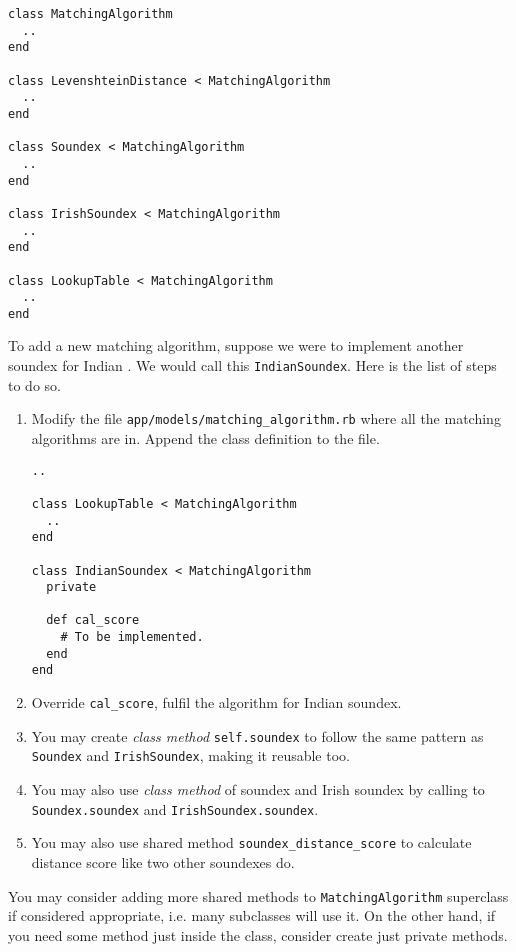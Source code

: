 \begin{minipage}{\linewidth}
  \begin{lstlisting}[label={lst:maf}, caption={\texttt{matching\_algorithm.rb}.}]
class MatchingAlgorithm
  ..
end

class LevenshteinDistance < MatchingAlgorithm
  ..
end

class Soundex < MatchingAlgorithm
  ..
end

class IrishSoundex < MatchingAlgorithm
  ..
end

class LookupTable < MatchingAlgorithm
  ..
end
\end{lstlisting}
\end{minipage}

To add a new matching algorithm, suppose we were to implement another
soundex for Indian \cite[]{indiansoundex}. We would call this \texttt{IndianSoundex}.
Here is the list of steps to do so.

\begin{enumerate}
  \item Modify the file \texttt{app/models/matching\_algorithm.rb} where all
    the matching algorithms are in. Append the class definition to the file.

    \begin{minipage}{\linewidth}
    \begin{lstlisting}
..

class LookupTable < MatchingAlgorithm
  ..
end

class IndianSoundex < MatchingAlgorithm
  private

  def cal_score
    # To be implemented.
  end
end
    \end{lstlisting}
    \end{minipage}

  \item Override \texttt{cal\_score}, fulfil the algorithm for Indian
    soundex.
  \item You may create \emph{class method} \texttt{self.soundex} to follow
    the same pattern as \texttt{Soundex} and \texttt{IrishSoundex}, making
    it reusable too.
  \item You may also use \emph{class method} of soundex and Irish soundex
    by calling to \texttt{Soundex.soundex} and \texttt{IrishSoundex.soundex}.
  \item You may also use shared method \texttt{soundex\_distance\_score}
    to calculate distance score like two other soundexes do.
\end{enumerate}

You may consider adding more shared methods to \texttt{MatchingAlgorithm}
superclass if considered appropriate, i.e. many subclasses will use it.
On the other hand, if you need some method just inside the class,
consider create just private methods.

